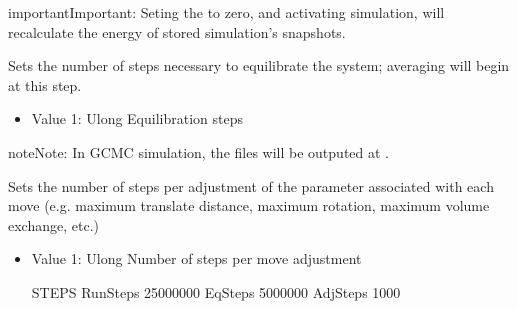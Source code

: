 \documentclass[letterpaper,10pt,english]{sphinxmanual}
\begin{document}
\begin{description}
\begin{sphinxadmonition}{important}{Important:}
Seting the  to zero, and activating  simulation, will recalculate the energy of stored simulation’s snapshots.
\end{sphinxadmonition}

\item[{\sphinxcode{\sphinxupquote{EqSteps}}}] \leavevmode
Sets the number of steps necessary to equilibrate the system; averaging will begin at this step.
\begin{itemize}
\item {} 
Value 1: Ulong \sphinxhyphen{} Equilibration steps

\end{itemize}

\begin{sphinxadmonition}{note}{Note:}
In GCMC simulation, the  files will be outputed at .
\end{sphinxadmonition}

\item[{\sphinxcode{\sphinxupquote{AdjSteps}}}] \leavevmode
Sets the number of steps per adjustment of the parameter associated with each move (e.g. maximum translate distance, maximum rotation, maximum volume exchange, etc.)
\begin{itemize}
\item {} 
Value 1: Ulong \sphinxhyphen{} Number of steps per move adjustment

\begin{sphinxVerbatim}[commandchars=\\\{\}]
\PYGZsh{}\PYGZsh{}\PYGZsh{}\PYGZsh{}\PYGZsh{}\PYGZsh{}\PYGZsh{}\PYGZsh{}\PYGZsh{}\PYGZsh{}\PYGZsh{}\PYGZsh{}\PYGZsh{}\PYGZsh{}\PYGZsh{}\PYGZsh{}\PYGZsh{}\PYGZsh{}\PYGZsh{}\PYGZsh{}\PYGZsh{}\PYGZsh{}\PYGZsh{}\PYGZsh{}\PYGZsh{}\PYGZsh{}\PYGZsh{}\PYGZsh{}\PYGZsh{}\PYGZsh{}\PYGZsh{}\PYGZsh{}\PYGZsh{}
\PYGZsh{} STEPS
\PYGZsh{}\PYGZsh{}\PYGZsh{}\PYGZsh{}\PYGZsh{}\PYGZsh{}\PYGZsh{}\PYGZsh{}\PYGZsh{}\PYGZsh{}\PYGZsh{}\PYGZsh{}\PYGZsh{}\PYGZsh{}\PYGZsh{}\PYGZsh{}\PYGZsh{}\PYGZsh{}\PYGZsh{}\PYGZsh{}\PYGZsh{}\PYGZsh{}\PYGZsh{}\PYGZsh{}\PYGZsh{}\PYGZsh{}\PYGZsh{}\PYGZsh{}\PYGZsh{}\PYGZsh{}\PYGZsh{}\PYGZsh{}\PYGZsh{}
RunSteps    25000000
EqSteps     5000000
AdjSteps    1000
\end{sphinxVerbatim}

\end{itemize}


\end{description}
\end{document}
